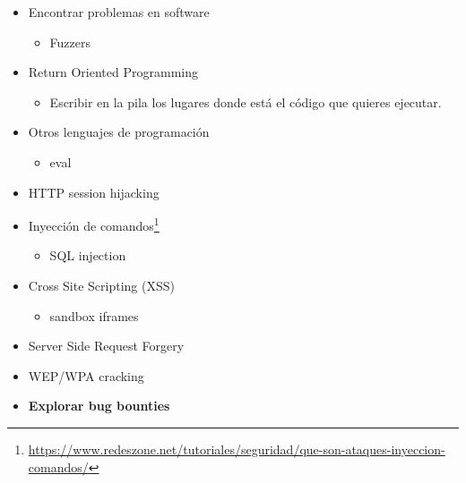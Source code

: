 \documentclass[
  12,
]{scrartcl}
\DeclareRobustCommand{\href}[2]{#2\footnote{\url{#1}}}
\providecommand{\tightlist}{%
  \setlength{\itemsep}{0pt}\setlength{\parskip}{0pt}}
\begin{document}
\begin{itemize}
\begin{itemize}
    \begin{itemize}
    \item
      Hacer que el programa te diga el código secreto.

      ¿Sobreescribir cuidando mantener este código secreto?
    \end{itemize}
  \item
    \href{https://googleprojectzero.blogspot.com/2019/02/examining-pointer-authentication-on.html}{Pointer
    Autentication}

    \begin{itemize}
    \tightlist
    \item
      ¿Fuerza bruta?
    \end{itemize}
  \end{itemize}
\item
  Encontrar problemas en software

  \begin{itemize}
  \tightlist
  \item
    Fuzzers
  \end{itemize}
\item
  Return Oriented Programming

  \begin{itemize}
  \tightlist
  \item
    Escribir en la pila los lugares donde está el código que quieres
    ejecutar.
  \end{itemize}
\item
  Otros lenguajes de programación

  \begin{itemize}
  \tightlist
  \item
    eval
  \end{itemize}
\item
  HTTP session hijacking
\item
  \href{https://www.redeszone.net/tutoriales/seguridad/que-son-ataques-inyeccion-comandos/}{Inyección
  de comandos}

  \begin{itemize}
  \tightlist
  \item
    SQL injection
  \end{itemize}
\item
  Cross Site Scripting (XSS)

  \begin{itemize}
  \tightlist
  \item
    sandbox iframes
  \end{itemize}
\item
  Server Side Request Forgery
\item
  WEP/WPA cracking
\item
  \textbf{Explorar bug bounties}
\end{itemize}
\end{document}

